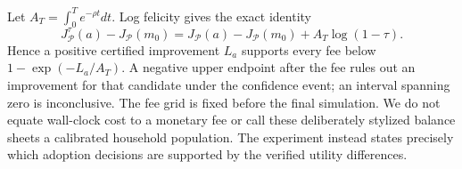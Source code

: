 Let $A_T=\int_0^T e^{-\rho t}dt$. Log felicity gives the exact identity
\begin{equation}\label{eq:r12fee}
 J_{\mathcal P}^{\tau}(a)-J_{\mathcal P}(m_0)
 =J_{\mathcal P}(a)-J_{\mathcal P}(m_0)+A_T\log(1-\tau).
\end{equation}
Hence a positive certified improvement $L_a$ supports every fee below
$1-\exp(-L_a/A_T)$. A negative upper endpoint after the fee rules out an improvement for that candidate under the confidence event; an interval spanning zero is inconclusive. The fee grid is fixed before the final simulation. We do not equate wall-clock cost to a monetary fee or call these deliberately stylized balance sheets a calibrated household population. The experiment instead states precisely which adoption decisions are supported by the verified utility differences.
